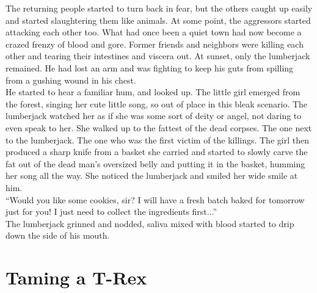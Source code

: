 \documentclass[a4paper,onecolumn,11pt]{article}
\begin{document}
\newline
The returning people started to turn back in fear, but the others caught up easily and started slaughtering them like animals. At some point, the aggressors started attacking each other too. What had once been a quiet town had now become a crazed frenzy of blood and gore. Former friends and neighbors were killing each other and tearing their intestines and viscera out. At sunset, only the lumberjack remained. He had lost an arm and was fighting to keep his guts from spilling from a gushing wound in his chest.\\
\newline
He started to hear a familiar hum, and looked up. The little girl emerged from the forest, singing her cute little song, so out of place in this bleak scenario. The lumberjack watched her as if she was some sort of deity or angel, not daring to even speak to her. She walked up to the fattest of the dead corpses. The one next to the lumberjack. The one who was the first victim of the killings. The girl then produced a sharp knife from a basket she carried and started to slowly carve the fat out of the dead man's oversized belly and putting it in the basket, humming her song all the way. She noticed the lumberjack and smiled her wide smile at him.\\
\newline
``Would you like some cookies, sir? I will have a fresh batch baked for tomorrow just for you! I just need to collect the ingredients first...''\\
\newline
The lumberjack grinned and nodded, saliva mixed with blood started to drip down the side of his mouth.

\newpage


\section{Taming a T-Rex}
\end{document}
